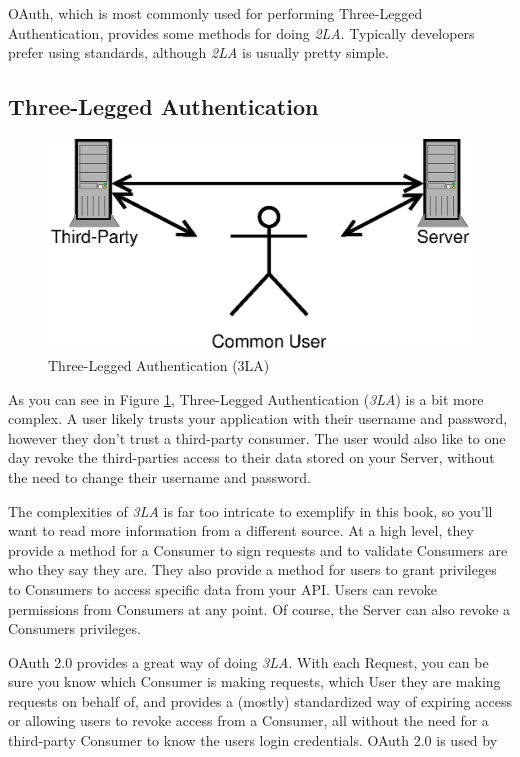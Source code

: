 \documentclass{book}
\begin{document}
OAuth, which is most commonly used for performing Three-Legged Authentication, provides some methods for doing \emph{2LA}. Typically developers prefer using standards, although \emph{2LA} is usually pretty simple.

\subsection{Three-Legged Authentication}

\begin{figure}[!htb]
\centering
\includegraphics[scale=.6]{images/three-legged.eps}
\caption{Three-Legged Authentication (3LA)}
\label{fig:threelegged}
\end{figure}

As you can see in Figure \ref{fig:threelegged}, Three-Legged Authentication (\emph{3LA}) is a bit more complex. A user likely trusts your application with their username and password, however they don't trust a third-party consumer. The user would also like to one day revoke the third-parties access to their data stored on your Server, without the need to change their username and password.

The complexities of \emph{3LA} is far too intricate to exemplify in this book, so you'll want to read more information from a different source. At a high level, they provide a method for a Consumer to sign requests and to validate Consumers are who they say they are. They also provide a method for users to grant privileges to Consumers to access specific data from your API. Users can revoke permissions from Consumers at any point. Of course, the Server can also revoke a Consumers privileges.

OAuth 2.0 \cite{RFC6749} provides a great way of doing \emph{3LA}. With each Request, you can be sure you know which Consumer is making requests, which User they are making requests on behalf of, and provides a (mostly) standardized way of expiring access or allowing users to revoke access from a Consumer, all without the need for a third-party Consumer to know the users login credentials. OAuth 2.0 is used by 
\end{document}
